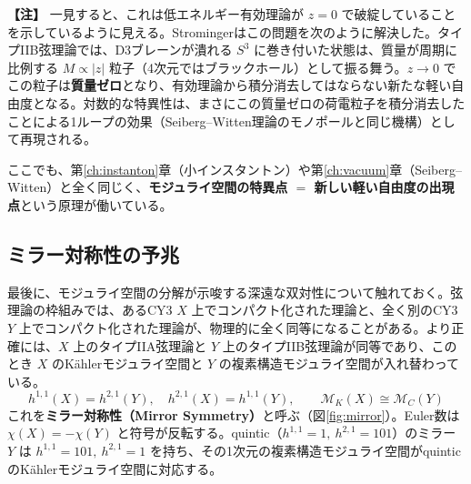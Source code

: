 \documentclass[uplatex, dvipdfmx, book]{jsbook}
\let\origsubsection\subsection
\let\origsubsubsection\subsubsection
\renewcommand{\section}{\origsubsection}
\renewcommand{\subsection}{\origsubsubsection}
\renewcommand{\subsubsection}{\paragraph}
\newenvironment{note}{\vspace{1ex}\par\footnotesize\noindent\textbf{【注】}}{\par\vspace{1ex}}
\begin{document}
\begin{note}
一見すると、これは低エネルギー有効理論が $z = 0$ で破綻していることを示しているように見える。Stromingerはこの問題を次のように解決した\cite{strominger1995}。タイプIIB弦理論では、D3ブレーンが潰れる $S^3$ に巻き付いた状態は、質量が周期に比例する $M \propto |z|$ 粒子（4次元ではブラックホール）として振る舞う。$z \to 0$ でこの粒子は\textbf{質量ゼロ}となり、有効理論から積分消去してはならない新たな軽い自由度となる。対数的な特異性は、まさにこの質量ゼロの荷電粒子を積分消去したことによる1ループの効果（Seiberg--Witten理論のモノポールと同じ機構）として再現される。

ここでも、第\ref{ch:instanton}章（小インスタントン）や第\ref{ch:vacuum}章（Seiberg--Witten）と全く同じく、\textbf{モジュライ空間の特異点 $=$ 新しい軽い自由度の出現点}という原理が働いている。
\end{note}

\section{ミラー対称性の予兆}

最後に、モジュライ空間の分解が示唆する深遠な双対性について触れておく。弦理論の枠組みでは、あるCY3 $X$ 上でコンパクト化された理論と、全く別のCY3 $Y$ 上でコンパクト化された理論が、物理的に全く同等になることがある。より正確には、$X$ 上のタイプIIA弦理論と $Y$ 上のタイプIIB弦理論が同等であり、このとき $X$ のK\"ahlerモジュライ空間と $Y$ の複素構造モジュライ空間が入れ替わっている。
\begin{equation}
    h^{1,1}(X) = h^{2,1}(Y), \quad h^{2,1}(X) = h^{1,1}(Y), \qquad \mathcal{M}_K(X) \cong \mathcal{M}_C(Y)
\end{equation}
これを\textbf{ミラー対称性（Mirror Symmetry）}と呼ぶ（図\ref{fig:mirror}）。Euler数は $\chi(X) = -\chi(Y)$ と符号が反転する。quintic（$h^{1,1} = 1,\ h^{2,1} = 101$）のミラー $Y$ は $h^{1,1} = 101,\ h^{2,1} = 1$ を持ち、その1次元の複素構造モジュライ空間がquinticのK\"ahlerモジュライ空間に対応する。
\end{document}
